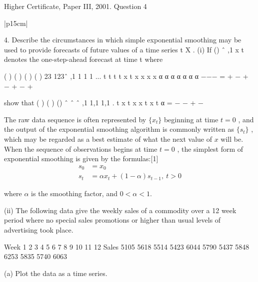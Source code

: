\documentclass[a4paper,12pt]{article}
\begin{document}

Higher Certificate, Paper III, 2001. Question 4

\begin{table}[ht!]
     


\centering
     


\begin{tabular}{|p{15cm}|}
     


\hline 

4. Describe the circumstances in which simple exponential smoothing may be used to provide forecasts 
of future values of a time series t X .  
 (i) If () ˆ ,1 x t denotes the one-step-ahead forecast at time t where 
 
  ( ) ( ) ( ) ( ) 23 123ˆ ,1 1 1 1 ... t t t t x t x x x x α α α α α α α −−− = + − + − + − +
 
 show that ( ) ( ) { } () ˆ ˆ ˆ ,1 1,1 1,1 . t x t x x t x t α = − − + −   

\begin{framed}
The raw data sequence is often represented by 
${\displaystyle \{x_{t}\}}$ 
 beginning at time 
$ {\displaystyle t=0}$ 
, and the output of the exponential smoothing algorithm is commonly written as 
$ {\displaystyle \{s_{t}\}} $
, which may be regarded as a best estimate of what the next value of 
$ {\displaystyle x} $
 will be. When the sequence of observations begins at time 
${\displaystyle t=0} $
, the simplest form of exponential smoothing is given by the formulas:[1] 
\[ {\displaystyle {\begin{aligned}s_{0}&=x_{0}\\s_{t}&=\alpha x_{t}+(1-\alpha )s_{t-1},\ t>0\end{aligned}}} \]
 
where 
$ {\displaystyle \alpha } $
 is the smoothing factor, and 
$ {\displaystyle 0<\alpha <1} $. 
\end{framed}
 
(ii) The following data give the weekly sales of a commodity over a 12 week period where no special sales promotions or higher 
than usual levels of advertising took place. 
 
Week 1 2 3 4 5 6 7 8 9 10 11 12 
Sales 5105 5618 5514 5423 6044 5790 5437 5848 6253 5835 5740 6063 
 
(a) Plot the data as a time series. 


\end{tabular}
\end{table}
\end{document}
